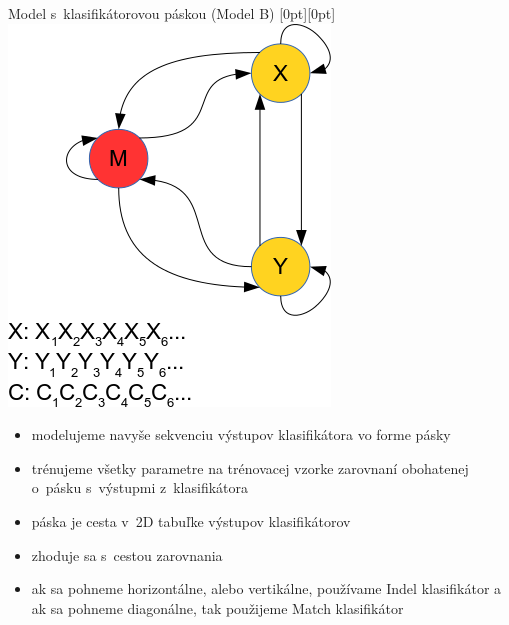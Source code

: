 \documentclass[xcolor=dvipsnames, compress, 12pt]{beamer}
\newcommand{\lenitem}[2][.6\linewidth]{\parbox[t]{#1}{\strut #2\strut}}
\theoremstyle{definition}
\begin{document}
\begin{frame}{Model s~klasifikátorovou páskou (Model B)}
  \mbox{}\hfill\raisebox{-\height}[0pt][0pt]{
   \includegraphics[width=.30\textwidth]{images/model_clf_paska}
   }
  \vspace*{-\baselineskip}

  \begin{itemize}
      \item \lenitem{modelujeme navyše sekvenciu výstupov klasifikátora vo forme pásky}
      \item \lenitem{trénujeme všetky parametre na trénovacej vzorke zarovnaní obohatenej o~pásku s~výstupmi z~klasifikátora}
  \end{itemize}

  \begin{itemize}
    \item \lenitem{páska je cesta v~2D tabuľke výstupov klasifikátorov}
    \item \lenitem{zhoduje sa s~cestou zarovnania}
    \item ak sa pohneme horizontálne, alebo vertikálne, používame Indel klasifikátor a ak sa pohneme diagonálne, tak použijeme Match klasifikátor
  \end{itemize}
\end{frame}
\end{document}
